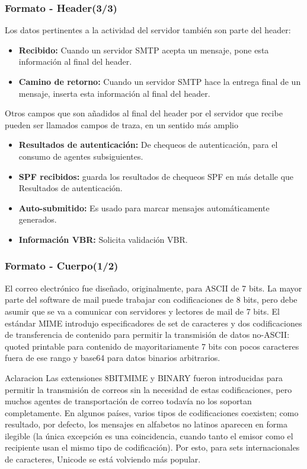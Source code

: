 \documentclass{beamer}
\begin{document}
\begin{frame}
\frametitle{Formato - Header(3/3)}
\tableofcontents
Los datos pertinentes a la actividad del servidor también son parte del header:
\begin{itemize}
\item \small \textbf{Recibido:} Cuando un servidor SMTP acepta un mensaje, pone esta información al final del header.
\item \small \textbf{Camino de retorno:} Cuando un servidor SMTP hace la entrega final de un mensaje, inserta esta información al final del header.
\end{itemize}
Otros campos que son añadidos al final del header por el servidor que recibe pueden ser llamados campos de traza, en un sentido más amplio
\begin{itemize}
\item \small \textbf{Resultados de autenticación:} De chequeos de autenticación, para el consumo de agentes subsiguientes.
\item \small \textbf{SPF recibidos:} guarda los resultados de chequeos SPF en más detalle que Resultados de autenticación.
\item \small \textbf{Auto-submitido:} Es usado para marcar mensajes automáticamente generados.
\item \small \textbf{Información VBR:} Solicita validación VBR.
\end{itemize}

\end{frame}

\begin{frame}
\frametitle{Formato - Cuerpo(1/2)}
\tableofcontents
\small El correo electrónico fue diseñado, originalmente, para ASCII de 7 bits. La mayor parte del software de mail puede trabajar con codificaciones de 8 bits, pero debe asumir que se va a comunicar con servidores y lectores de mail de 7 bits.
\small El estándar MIME introdujo especificadores de set de caracteres y dos codificaciones de transferencia de contenido para permitir la transmisión de datos no-ASCII: quoted printable para contenido de mayoritariamente 7 bits con pocos caracteres fuera de ese rango y base64 para datos binarios arbitrarios. 

\begin{block}{Aclaracion}
\small Las extensiones 8BITMIME y BINARY fueron introducidas para permitir la transmisión de correos sin la necesidad de estas codificaciones, pero muchos agentes de transportación de correo todavía no los soportan completamente.
\small En algunos países, varios tipos de codificaciones coexisten; como resultado, por defecto, los mensajes en alfabetos no latinos aparecen en forma ilegible (la única excepción es una coincidencia, cuando tanto el emisor como el recipiente usan el mismo tipo de codificación). Por esto, para sets internacionales de caracteres, Unicode se está volviendo más popular.
\end{block}

\end{frame}
\end{document}
